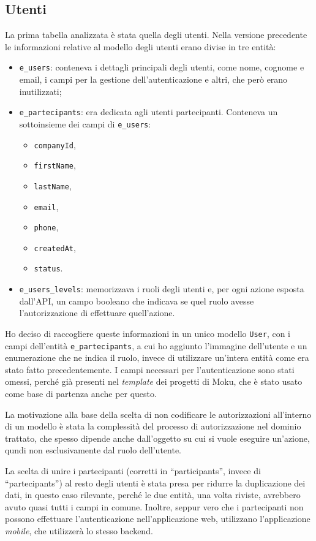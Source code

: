 \subsection{Utenti} \label{modelli:utenti}
La prima tabella analizzata è stata quella degli utenti. Nella versione precedente le informazioni relative al modello degli utenti erano divise in tre entità:
\begin{itemize}
	\item \verb|e_users|: conteneva i dettagli principali degli utenti, come nome, cognome e email, i campi per la gestione dell'autenticazione e altri, che però erano inutilizzati;
	\item \verb|e_partecipants|: era dedicata agli utenti partecipanti. Conteneva un sottoinsieme dei campi di \verb|e_users|:
	\begin{itemize}
		\item \verb|companyId|,
		\item \verb|firstName|,
		\item \verb|lastName|,
		\item \verb|email|,
		\item \verb|phone|,
		\item \verb|createdAt|,
		\item \verb|status|.
	\end{itemize}
	\item \verb|e_users_levels|: memorizzava i ruoli degli utenti e, per ogni azione esposta dall'API, un campo booleano che indicava se quel ruolo avesse l'autorizzazione di effettuare quell'azione.
\end{itemize}
Ho deciso di raccogliere queste informazioni in un unico modello \verb|User|, con i campi dell'entità \verb|e_partecipants|, a cui ho aggiunto l'immagine dell'utente e un enumerazione che ne indica il ruolo, invece di utilizzare un'intera entità come era stato fatto precedentemente. I campi necessari per l'autenticazione sono stati omessi, perché già presenti nel \emph{template} dei progetti di Moku, che è stato usato come base di partenza anche per questo.

La motivazione alla base della scelta di non codificare le autorizzazioni all'interno di un modello è stata la complessità del processo di autorizzazione nel dominio trattato, che spesso dipende anche dall'oggetto su cui si vuole eseguire un'azione, qundi non esclusivamente dal ruolo dell'utente.

La scelta di unire i partecipanti (corretti in ``participants'', invece di ``partecipants'') al resto degli utenti è stata presa per ridurre la duplicazione dei dati, in questo caso rilevante, perché le due entità, una volta riviste, avrebbero avuto quasi tutti i campi in comune. Inoltre, seppur vero che i partecipanti non possono effettuare l'autenticazione nell'applicazione web, utilizzano l'applicazione \emph{mobile}, che utilizzerà lo stesso backend.



